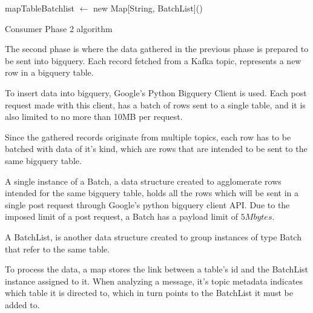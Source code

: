 \IncMargin{1em}
\begin{algorithm}[h]
\BlankLine

mapTableBatchlist $\leftarrow$ new Map[String, BatchList]()\;
\caption{Consumer Phase 2 algorithm}
\label{algo:phase_2}
\end{algorithm}\DecMargin{1em}

The second phase is where the data gathered in the previous phase is prepared to be sent into bigquery. Each record fetched from a Kafka topic, represents a new row in a bigquery table. 

To insert data into bigquery, Google's Python Bigquery Client is used. Each post request made with this client, has a batch of rows sent to a single table, and it is also limited to no more than 10MB per request.

Since the gathered records originate from multiple topics, each row has to be batched with data of it's kind, which are rows that are intended to be sent to the same bigquery table.

A single instance of a Batch, a data structure created to agglomerate rows intended for the same bigquery table, holds all the rows which will be sent in a single post request through Google's python bigquery client API. Due to the imposed limit of a post request, a Batch has a payload limit of $5 Mbytes$. 

A BatchList, is another data structure created to group instances of type Batch that refer to the same table.

To process the data, a map stores the link between a table's id and the BatchList instance assigned to it. When analyzing a message, it's topic metadata indicates which table it is directed to, which in turn points to the BatchList it must be added to.

